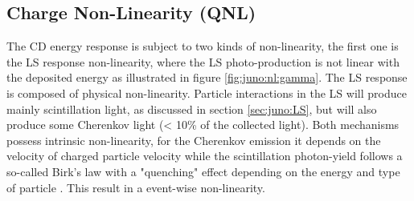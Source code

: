 \documentclass[../main.tex]{subfiles}
\begin{document}
%
%
%
%
%
%

\subsection{Charge Non-Linearity (QNL)}
\label{sec:joint_fit:qnl}

The CD energy response is subject to two kinds of non-linearity, the first one is the LS response non-linearity, where the LS photo-production is not linear with the deposited energy as illustrated in figure \ref{fig:juno:nl:gamma}. The LS response is composed of physical non-linearity. Particle interactions in the LS will produce mainly scintillation light, as discussed in section \ref{sec:juno:LS}, but will also produce some Cherenkov light (< 10\% of the collected light). Both mechanisms possess intrinsic non-linearity, for the Cherenkov emission it depends on the velocity of charged particle velocity while the scintillation photon-yield follows a so-called Birk's law with a "quenching" effect depending on the energy and type of particle \cite{particle_data_group_review_2020}. This result in a event-wise non-linearity.
\end{document}
